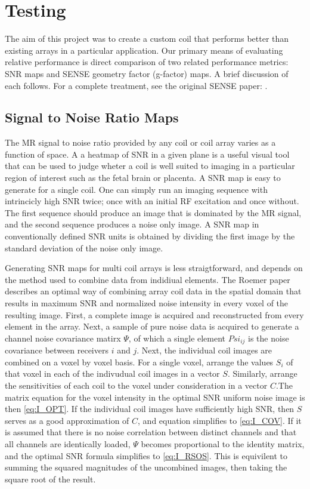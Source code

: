 \chapter{Testing}
The aim of this project was to create a custom coil that performs better than existing arrays in a
particular application. Our primary means of evaluating relative performance is direct comparison of two related
performance metrics: SNR maps and SENSE geometry factor (g-factor) maps. A brief discussion of each follows. For a
complete treatment, see the original SENSE paper: \cite{Pruessmann1999}.

\section{Signal to Noise Ratio Maps}
The MR signal to noise ratio provided by any coil or coil array varies as a function
of space. A a heatmap of SNR in a given plane is a useful visual tool that can be used to judge wheter a coil is well
suited to imaging in a particular region of interest such as the fetal brain or placenta. A SNR map is easy to generate
for a single coil. One can simply run an imaging sequence with intrincicly high SNR twice; once with an initial RF
excitation and once without. The first sequence should produce an image that is dominated by the MR signal, and the
second sequence produces a noise only image. A SNR map in conventionally defined SNR units is obtained by dividing the
first image by the standard deviation of the noise only image.

Generating SNR maps for multi coil arrays is less straigtforward, and depends on the method used to combine data from
indidiual elements. The Roemer paper \cite{Roemer90} describes an optimal way of combining array coil data in the
spatial domain that results in maximum SNR and normalized noise intensity in every voxel of the resulting image.  First,
a complete image is acquired and reconstructed from every element in the array. Next, a sample of pure noise data is
acquired to generate a channel noise covariance matirx $\Psi$, of which a single element $Psi_{ij}$ is the noise
covariance between receivers $i$ and $j$. Next, the individual coil images are combined on a voxel by voxel basis. For a
single voxel, arrange the values $S_i$ of that voxel in each of the indivudual coil images in a vector $S$.  Similarly,
arrange the sensitivities of each coil to the voxel under consideration in a vector $C$.The matrix equation for the
voxel intensity in the optimal SNR uniform noise image is then \ref{eq:I_OPT}. If the individual coil images have
sufficiently high SNR, then $S$ serves as a good approximation of $C$, and equation simplifies to \ref{eq:I_COV}.  If it
is assumed that there is no noise correlation between distinct channels and that all channels are identically loaded,
$\Psi$ becomes proportional to the identity matrix, and the optimal SNR formula simplifies to \ref{eq:I_RSOS}. This is
equivilent to summing the squared magnitudes of the uncombined images, then taking the square root of the result.

